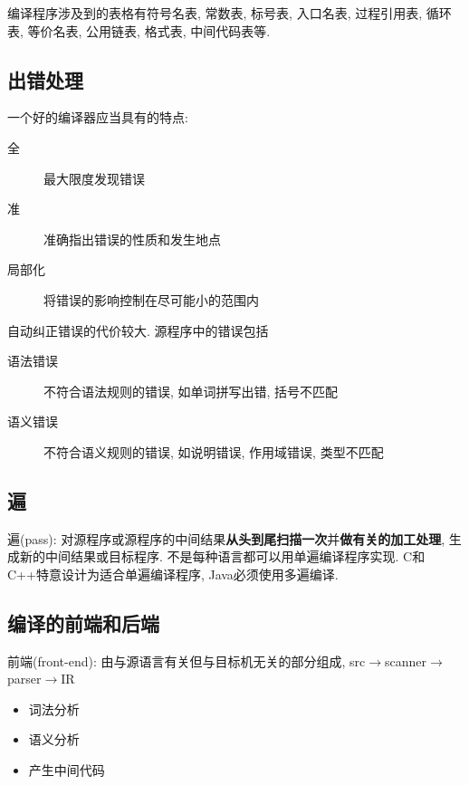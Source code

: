         编译程序涉及到的表格有符号名表, 常数表, 标号表, 入口名表, 过程引用表, 循环表, 等价名表, 公用链表, 格式表, 中间代码表等.

    \subsection{出错处理}
        
        一个好的编译器应当具有的特点:
        \begin{description}
            \item[全] 最大限度发现错误
            \item[准] 准确指出错误的性质和发生地点
            \item[局部化] 将错误的影响控制在尽可能小的范围内
        \end{description}

        自动纠正错误的代价较大. 源程序中的错误包括
        \begin{description}
            \item[语法错误] 不符合语法规则的错误, 如单词拼写出错, 括号不匹配
            \item[语义错误] 不符合语义规则的错误, 如说明错误, 作用域错误, 类型不匹配
        \end{description}

    \subsection{遍}

        \textsf{遍}(pass): 对源程序或源程序的中间结果\textbf{从头到尾扫描一次}并\textbf{做有关的加工处理}, 生成新的中间结果或目标程序. 不是每种语言都可以用单遍编译程序实现. C和C++特意设计为适合单遍编译程序, Java必须使用多遍编译.

    \subsection{编译的前端和后端}

        \textsf{前端}(front-end): 由与源语言有关但与目标机无关的部分组成, src$\to$scanner$\to$parser$\to$IR

        \begin{itemize}
            \item 词法分析
            \item 语义分析
            \item 产生中间代码
        \end{itemize}

